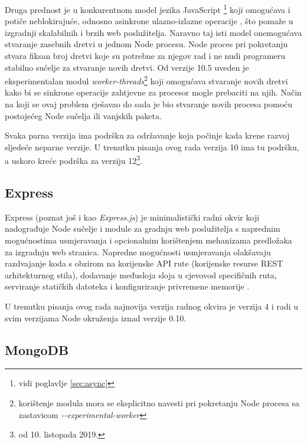 \documentclass[times, utf8, diplomski, numeric]{fer}
\begin{document}
Druga prednost je u konkurentnom model jezika JavaScript \footnote{vidi poglavlje \ref{sec:async}} koji omogućava i potiče neblokirajuće, odnosno asinkrone ulazno-izlazne operacije , što pomaže u izgradnji skalabilnih i brzih web poslužitelja.
Naravno taj isti model onemogućava stvaranje zasebnih dretvi u jednom Node procesu. Node proces pri pokretanju stvara fiksan broj dretvi koje su potrebne za njegov rad i ne nudi programeru stabilno sučelje za stvaranje novih dretvi.
Od verzije 10.5 uveden je eksperimentalan modul \emph{worker-threads}\footnote{
    korištenje modula mora se eksplicitno navesti pri pokretanju Node procesa sa zastavicom \emph{-{}-experimental-worker}
} koji omogućava stvaranje novih dretvi kako bi se sinkrone operacije zahtjevne za procesor  mogle prebaciti na njih.
Način na koji se ovaj problem rješavao do sada je bio stvaranje novih procesa pomoću postojećeg Node sučelja ili vanjskih paketa\citep{art_node}.

Svaka parna verzija ima podršku za održavanje  koja počinje kada krene razvoj sljedeće neparne verzije.
U trenutku pisanja ovog rada verzija 10 ima tu podršku, a uskoro kreće podrška za verziju 12\footnote{od 10. listopada 2019.}\citep{wiki_node}.


\subsection{Express}

Express (poznat još i kao \emph{Express.js}) je minimalistički radni okvir  koji nadograđuje Node sučelje i module za gradnju web poslužitelja s naprednim mogućnostima usmjeravanja  i opcionalnim korištenjem mehanizama predložaka  za izgradnju web stranica.
Napredne mogućnosti usmjeravanja olakšavaju razdvajanje koda s obzirom na korijenske API rute (korijenske resurse REST arhitekturnog stila), dodavanje međusloja sloja  u cjevovod  specifičnih ruta, serviranje statičkih datoteka i konfiguriranje privremene memorije .

U trenutku pisanja ovog rada najnovija verzija radnog okvira je verzija 4 i radi u svim verzijama Node okruženja iznad verzije 0.10\citep{gh_express}.


\subsection{MongoDB}
\end{document}
